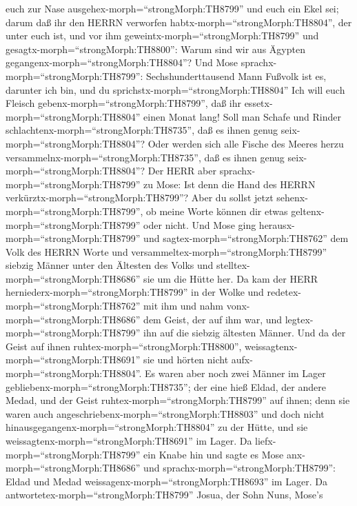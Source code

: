 euch zur Nase ausgehex-morph=``strongMorph:TH8799'' und euch ein Ekel
sei; darum daß ihr den HERRN verworfen
habtx-morph=``strongMorph:TH8804'', der unter euch ist, und vor ihm
geweintx-morph=``strongMorph:TH8799'' und
gesagtx-morph=``strongMorph:TH8800'': Warum sind wir aus Ägypten
gegangenx-morph=``strongMorph:TH8804''?  Und Mose
sprachx-morph=``strongMorph:TH8799'': Sechshunderttausend Mann Fußvolk
ist es, darunter ich bin, und du sprichstx-morph=``strongMorph:TH8804''
Ich will euch Fleisch gebenx-morph=``strongMorph:TH8799'', daß ihr
essetx-morph=``strongMorph:TH8804'' einen Monat lang!  Soll
man Schafe und Rinder schlachtenx-morph=``strongMorph:TH8735'', daß es
ihnen genug seix-morph=``strongMorph:TH8804''? Oder werden sich alle
Fische des Meeres herzu versammelnx-morph=``strongMorph:TH8735'', daß es
ihnen genug seix-morph=``strongMorph:TH8804''?  Der HERR
aber sprachx-morph=``strongMorph:TH8799'' zu Mose: Ist denn die Hand des
HERRN verkürztx-morph=``strongMorph:TH8799''? Aber du sollst jetzt
sehenx-morph=``strongMorph:TH8799'', ob meine Worte können dir etwas
geltenx-morph=``strongMorph:TH8799'' oder nicht.  Und Mose
ging herausx-morph=``strongMorph:TH8799'' und
sagtex-morph=``strongMorph:TH8762'' dem Volk des HERRN Worte und
versammeltex-morph=``strongMorph:TH8799'' siebzig Männer unter den
Ältesten des Volks und stelltex-morph=``strongMorph:TH8686'' sie um die
Hütte her.  Da kam der HERR
herniederx-morph=``strongMorph:TH8799'' in der Wolke und
redetex-morph=``strongMorph:TH8762'' mit ihm und nahm
vonx-morph=``strongMorph:TH8686'' dem Geist, der auf ihm war, und
legtex-morph=``strongMorph:TH8799'' ihn auf die siebzig ältesten Männer.
Und da der Geist auf ihnen ruhtex-morph=``strongMorph:TH8800'',
weissagtenx-morph=``strongMorph:TH8691'' sie und hörten nicht
aufx-morph=``strongMorph:TH8804''.  Es waren aber noch zwei
Männer im Lager gebliebenx-morph=``strongMorph:TH8735''; der eine hieß
Eldad, der andere Medad, und der Geist
ruhtex-morph=``strongMorph:TH8799'' auf ihnen; denn sie waren auch
angeschriebenx-morph=``strongMorph:TH8803'' und doch nicht
hinausgegangenx-morph=``strongMorph:TH8804'' zu der Hütte, und sie
weissagtenx-morph=``strongMorph:TH8691'' im Lager.  Da
liefx-morph=``strongMorph:TH8799'' ein Knabe hin und sagte es Mose
anx-morph=``strongMorph:TH8686'' und
sprachx-morph=``strongMorph:TH8799'': Eldad und Medad
weissagenx-morph=``strongMorph:TH8693'' im Lager.  Da
antwortetex-morph=``strongMorph:TH8799'' Josua, der Sohn Nuns, Mose's
